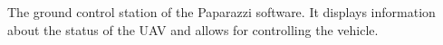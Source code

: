 \label{fig:gcs}
The ground control station of the Paparazzi software. It displays information about the status of the UAV and allows for controlling the vehicle.